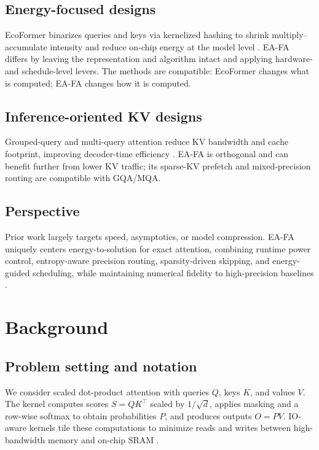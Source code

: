 \documentclass{article}
\begin{document}
\subsection{Energy-focused designs}
EcoFormer binarizes queries and keys via kernelized hashing to shrink multiply–accumulate intensity and reduce on-chip energy at the model level \cite{liu-2022-ecoformer}. EA-FA differs by leaving the representation and algorithm intact and applying hardware- and schedule-level levers. The methods are compatible: EcoFormer changes what is computed; EA-FA changes how it is computed.

\subsection{Inference-oriented KV designs}
Grouped-query and multi-query attention reduce KV bandwidth and cache footprint, improving decoder-time efficiency \cite{ainslie-2023-gqa}. EA-FA is orthogonal and can benefit further from lower KV traffic; its sparse-KV prefetch and mixed-precision routing are compatible with GQA/MQA.

\subsection{Perspective}
Prior work largely targets speed, asymptotics, or model compression. EA-FA uniquely centers energy-to-solution for exact attention, combining runtime power control, entropy-aware precision routing, sparsity-driven skipping, and energy-guided scheduling, while maintaining numerical fidelity to high-precision baselines \cite{dao-2022-flashattention,dao-2023-flashattention,shah-2024-flashattention}.

\section{Background}
\subsection{Problem setting and notation}
We consider scaled dot-product attention with queries \(Q\), keys \(K\), and values \(V\). The kernel computes scores \(S = Q K^\top\) scaled by \(1/\sqrt{d}\), applies masking and a row-wise softmax to obtain probabilities \(P\), and produces outputs \(O = P V\). IO-aware kernels tile these computations to minimize reads and writes between high-bandwidth memory and on-chip SRAM \cite{dao-2022-flashattention}.
\end{document}
